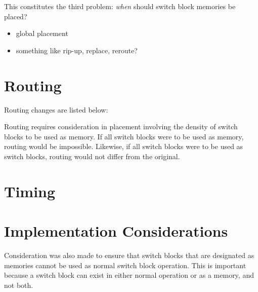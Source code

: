 This constitutes the third problem: \textit{when} should switch block memories be placed?
\begin{itemize}
    \item global placement
    \item something like rip-up, replace, reroute?
\end{itemize}


\section{Routing}
\label{cad:route}

Routing changes are listed below:


Routing requires consideration in placement involving the density of switch blocks to be used as memory. If all switch blocks were to be used as memory, routing would be impossible. Likewise, if all switch blocks were to be used as switch blocks, routing would not differ from the original. 

\section{Timing}
\label{cad:timing}

\section{Implementation Considerations}
Consideration was also made to ensure that switch blocks that are designated as memories cannot be used as normal switch block operation. This is important because a switch block can exist in either normal operation or as a memory, and not both.

